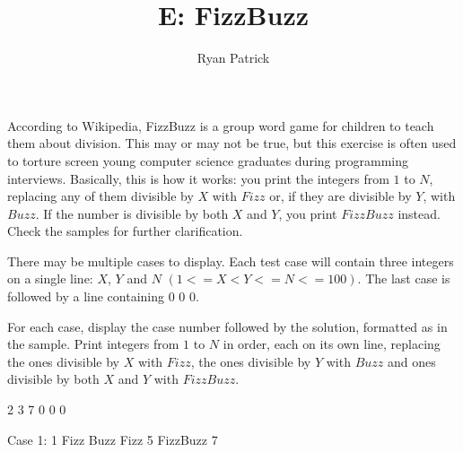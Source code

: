 \documentclass{article}
\title{E: FizzBuzz}
\author{Ryan Patrick}
\begin{document}
\begin{problemDescription}
According to Wikipedia, FizzBuzz is a group word game for children to teach 
them about division. This may or may not be true, but this exercise is
often used to torture screen young computer science graduates during 
programming interviews.  Basically, this is how it works: you print the integers 
from $1$ to $N$, replacing any of them divisible by $X$ with $Fizz$ or, if they are
divisible by $Y$, with $Buzz$. If the number is divisible by both $X$ and $Y$, 
you print $FizzBuzz$ instead.
Check the samples for further clarification.
\end{problemDescription}

\begin{inputDescription}
There may be multiple cases to display.  Each test case will contain three integers 
on a single line: $X$, $Y$ and $N$ $(1 <= X < Y <= N <= 100)$.
The last case is followed by a line containing 0 0 0.
\end{inputDescription}

\begin{outputDescription}
For each case, display the case number followed by the solution, formatted 
as in the sample.  Print integers from $1$ to $N$ in order, each on its own line, 
replacing the ones divisible by $X$ with $Fizz$, the ones divisible by $Y$ with 
$Buzz$ and ones divisible by both $X$ and $Y$ with $FizzBuzz$.
\end{outputDescription}

\begin{sampleInput}
2 3 7
0 0 0
\end{sampleInput}
\begin{sampleOutput}
Case 1: 
1
Fizz
Buzz
Fizz
5
FizzBuzz
7
\end{sampleOutput}
\end{document}
